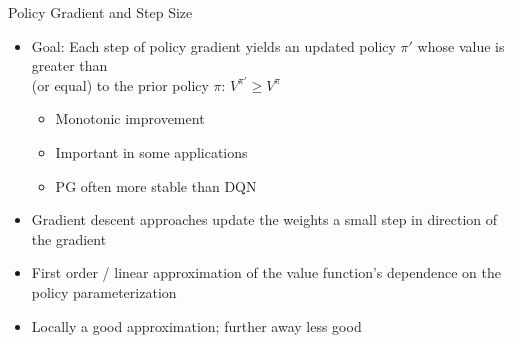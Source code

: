 \documentclass[aspectratio=169]{../latex_main/tntbeamer}  %
\begin{document}
\begin{frame}[c]{Policy Gradient and Step Size}
	
    \begin{itemize}
        \item Goal: Each step of policy gradient yields an updated policy $\pi'$ whose value is greater than\\ (or equal) to the prior policy $\pi$: $V^{\pi'} \geq V^\pi$
        \begin{itemize}
            \item Monotonic improvement
            \item Important in some applications
            \item PG often more stable than DQN
        \end{itemize} 
        \item Gradient descent approaches update the weights a small step in direction of the gradient
        \item First order / linear approximation of the value function's dependence on the policy parameterization
        \item Locally a good approximation; further away less good
    \end{itemize}

\end{frame}
\end{document}
